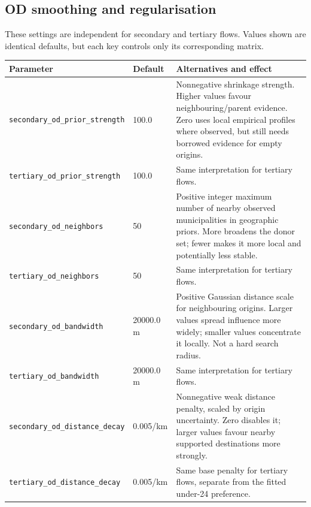 \documentclass[11pt,a4paper]{article}
\newcommand{\code}[1]{\nolinkurl{#1}}
\begin{document}
\subsection{OD smoothing and regularisation}
These settings are independent for secondary and tertiary flows. Values shown
are identical defaults, but each key controls only its corresponding matrix.

\small
\begin{longtable}{L{.34\textwidth}L{.13\textwidth}L{.45\textwidth}}
\toprule Parameter & Default & Alternatives and effect \\
\midrule\endhead
\code{secondary_od_prior_strength} & 100.0 & Nonnegative shrinkage strength.
Higher values favour neighbouring/parent evidence. Zero uses local empirical
profiles where observed, but still needs borrowed evidence for empty origins. \\
\code{tertiary_od_prior_strength} & 100.0 & Same interpretation for tertiary flows. \\
\code{secondary_od_neighbors} & 50 & Positive integer maximum number of nearby
observed municipalities in geographic priors. More broadens the donor set;
fewer makes it more local and potentially less stable. \\
\code{tertiary_od_neighbors} & 50 & Same interpretation for tertiary flows. \\
\code{secondary_od_bandwidth} & 20000.0 m & Positive Gaussian distance scale
for neighbouring origins. Larger values spread influence more widely;
smaller values concentrate it locally. Not a hard search radius. \\
\code{tertiary_od_bandwidth} & 20000.0 m & Same interpretation for tertiary flows. \\
\code{secondary_od_distance_decay} & 0.005/km & Nonnegative weak distance penalty,
scaled by origin uncertainty. Zero disables it; larger values favour nearby
supported destinations more strongly. \\
\code{tertiary_od_distance_decay} & 0.005/km & Same base penalty for tertiary
flows, separate from the fitted under-24 preference. \\
\bottomrule
\end{longtable}
\normalsize
\end{document}
